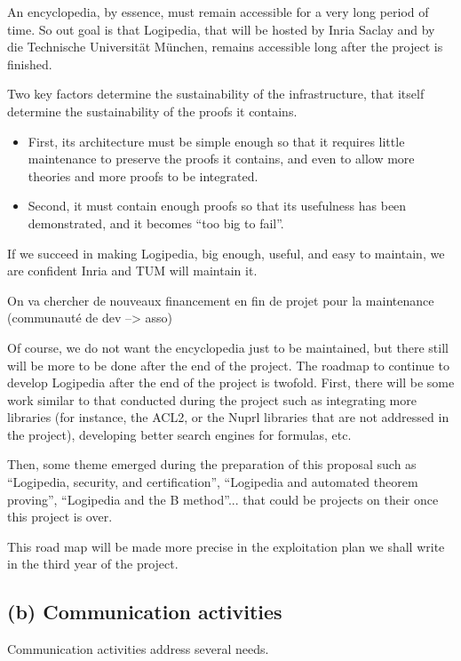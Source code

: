 An encyclopedia, by essence, must remain accessible for a very long
period of time. So out goal is that Logipedia, that will be hosted by
Inria Saclay and by die Technische Universität München, remains
accessible long after the project is finished. 

Two key factors determine the sustainability of the infrastructure,
that itself determine the sustainability of the proofs it contains.
\begin{itemize}
\item First, its architecture must be simple enough so that it requires
  little maintenance to preserve the proofs it contains, and even to
  allow more theories and more proofs to be integrated.
\item Second, it must contain enough proofs so that its usefulness has been
demonstrated, and it becomes ``too big to fail''.
\end{itemize} 

If we succeed in making Logipedia, big enough, useful, and easy to
maintain, we are confident Inria and TUM will maintain it.

{\color{red} On va chercher de nouveaux financement en fin de projet
  pour la maintenance (communauté de dev --> asso)}

Of course, we do not want the encyclopedia just to be maintained, but
there still will be more to be done after the end of the project. The
roadmap to continue to develop Logipedia after the end of the project
is twofold. First, there will be some work similar to that conducted
during the project such as integrating more libraries (for instance,
the ACL2, or the Nuprl libraries that are not addressed in the
project), developing better search engines for formulas, etc. 

Then, some theme emerged during the preparation of this proposal such
as ``Logipedia, security, and certification'', ``Logipedia and
automated theorem proving'', ``Logipedia and the B method''... that
could be projects on their once this project is over.

This road map will be made more precise in the exploitation plan 
we shall write in the third year of the project. 

\subsection*{(b) Communication activities}

Communication activities address several needs. 

